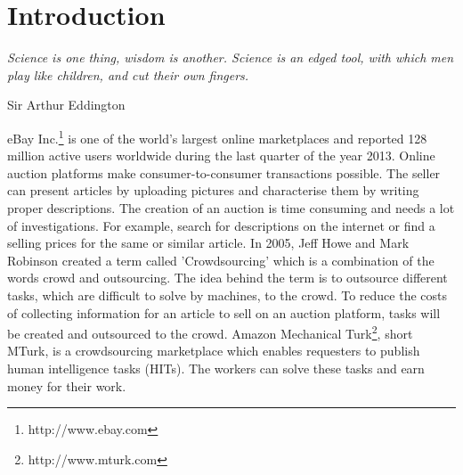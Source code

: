 \documentclass[a4paper]{report}
\begin{document}
  




%

\pagestyle{fancy} %
\fancyhf{}
\fancyhead[L]{\nouppercase{\leftmark}}
\fancyhead[C]{}
\fancyhead[R]{\thepage}
\renewcommand{\headrulewidth}{0.4pt} %
\newpage





\tableofcontents
\newpage

\listoffigures

\listoftables

\lstlistoflistings

\chapter{Introduction}
\epigraph{\textit{Science is one thing, wisdom is another. Science is an edged tool, with which men play like children, and cut their own fingers.}}{Sir Arthur Eddington}
eBay Inc.\footnote{http://www.ebay.com} is one of the world's largest online marketplaces and reported 128 million active users worldwide during the last quarter of the year 2013. Online auction platforms make consumer-to-consumer transactions possible. The seller can present articles by uploading pictures and characterise them by writing proper descriptions. The creation of an auction is time consuming and needs a lot of investigations. For example, search for descriptions on the internet or find a selling prices for the same or similar article. In 2005, Jeff Howe and Mark Robinson created a term called 'Crowdsourcing' which is a combination of the words crowd and outsourcing. The idea behind the term is to outsource different tasks, which are difficult to solve by machines, to the crowd. To reduce the costs of collecting information for an article to sell on an auction platform, tasks will be created and outsourced to the crowd. Amazon Mechanical Turk\footnote{http://www.mturk.com}, short MTurk, is a crowdsourcing marketplace which enables requesters to publish human intelligence tasks (HITs). The workers can solve these tasks and earn money for their work.
\end{document}
